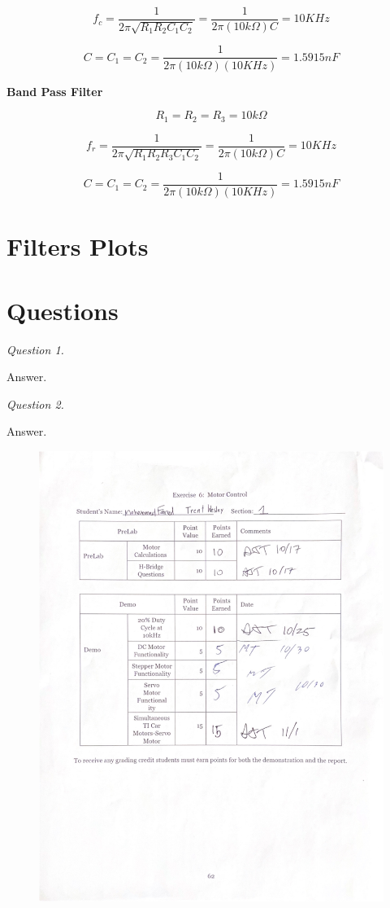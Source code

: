 \documentclass[CMPE]{KGCOEReport}
\begin{document}
\[
    f_c = \frac{1}{2\pi \sqrt{R_1R_2C_1C_2}} = \frac{1}{2\pi (10k\Omega)C} = 10 KHz
\]

\[
    C = C_1 = C_2 = \frac{1}{2\pi (10k\Omega)(10KHz)} = 1.5915 nF
\]

\textbf{Band Pass Filter}

\[
    R_1 = R_2 = R_3 = 10k\Omega
\]

\[
    f_r = \frac{1}{2\pi \sqrt{R_1R_2R_3C_1C_2}} = \frac{1}{2\pi (10k\Omega)C} = 10 KHz
\]

\[
    C = C_1 = C_2 = \frac{1}{2\pi (10k\Omega)(10KHz)} = 1.5915 nF
\]

\section*{Filters Plots} %

\section*{Questions}

\emph{Question 1.}

Answer.

\bigskip

\emph{Question 2.}

Answer.

\newpage
\begin{figure}[H]
    \centering
    \begin{adjustbox}{center}
        \includegraphics[width=1.26\textwidth]{signoff.pdf}
    \end{adjustbox}
\end{figure}
\end{document}
